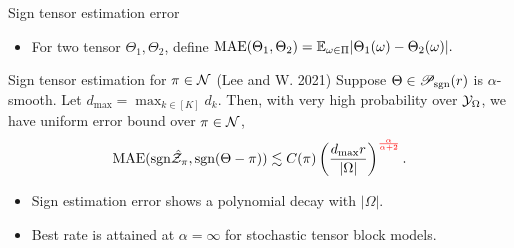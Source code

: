 \documentclass[10pt, mathserif]{beamer} %
\theoremstyle{definition}
\theoremstyle{plain}
\def\caliP{\mathscr{P}_{\textup{sgn}}}
\def\caliP{\mathscr{P}_{\textup{sgn}}}
\begin{document}
\begin{frame}{Sign tensor estimation error}
\begin{itemize}
\item For two tensor $\Theta_1,\Theta_2$, define $\textup{MAE}(\Theta_1,\Theta_2) = \mathbb{E}_{\omega\in\Pi}|\Theta_1(\omega)-\Theta_2(\omega)|.$
\end{itemize}
    \begin{block}{Sign tensor estimation for $\pi\in\mathcal{N}$ (Lee and W. 2021)}
    Suppose $\Theta\in\caliP(r)$ is $\alpha$-smooth. Let $d_{\max}=\max_{k\in[K]} d_k$. Then, with very high probability over $\mathcal{Y}_\Omega$, we have uniform error bound over $\pi\in\mathcal{N}$,
\begin{align}
\textup{MAE}(\text{sgn}\hat {\mathcal{Z}}_\pi, \text{sgn}(\Theta-\pi)) \lesssim  C(\pi)\left({d_{\max} r\over |\Omega|}\right)^{\color{red}\alpha\over \alpha+2}.
\end{align}
    \end{block}
    \begin{itemize}
    \item Sign estimation error shows a polynomial decay with $|\Omega|$. 
    \item Best rate is attained at $\alpha=\infty$ for stochastic tensor block models. 
    \end{itemize}
\end{frame}
\end{document}
